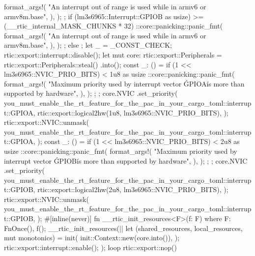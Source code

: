 {{{{{{{                                format_args!(
                                    "An interrupt out of range is used while in armv6 or armv8m.base",
                                ),
                            );
                        };
                    }
                    if (lm3s6965::Interrupt::GPIOB as usize)
                        >= (__rtic_internal_MASK_CHUNKS * 32)
                    {
                        {
                            ::core::panicking::panic_fmt(
                                format_args!(
                                    "An interrupt out of range is used while in armv6 or armv8m.base",
                                ),
                            );
                        };
                    }
                } else {}
            };
            let _ = _CONST_CHECK;
            rtic::export::interrupt::disable();
            let mut core: rtic::export::Peripherals = rtic::export::Peripherals::steal()
                .into();
            const _: () = if (1 << lm3s6965::NVIC_PRIO_BITS) < 1u8 as usize {
                {
                    ::core::panicking::panic_fmt(
                        format_args!(
                            "Maximum priority used by interrupt vector \'GPIOA\' is more than supported by hardware",
                        ),
                    );
                };
            };
            core.NVIC
                .set_priority(
                    you_must_enable_the_rt_feature_for_the_pac_in_your_cargo_toml::interrupt::GPIOA,
                    rtic::export::logical2hw(1u8, lm3s6965::NVIC_PRIO_BITS),
                );
            rtic::export::NVIC::unmask(
                you_must_enable_the_rt_feature_for_the_pac_in_your_cargo_toml::interrupt::GPIOA,
            );
            const _: () = if (1 << lm3s6965::NVIC_PRIO_BITS) < 2u8 as usize {
                {
                    ::core::panicking::panic_fmt(
                        format_args!(
                            "Maximum priority used by interrupt vector \'GPIOB\' is more than supported by hardware",
                        ),
                    );
                };
            };
            core.NVIC
                .set_priority(
                    you_must_enable_the_rt_feature_for_the_pac_in_your_cargo_toml::interrupt::GPIOB,
                    rtic::export::logical2hw(2u8, lm3s6965::NVIC_PRIO_BITS),
                );
            rtic::export::NVIC::unmask(
                you_must_enable_the_rt_feature_for_the_pac_in_your_cargo_toml::interrupt::GPIOB,
            );
            #[inline(never)]
            fn __rtic_init_resources<F>(f: F)
            where
                F: FnOnce(),
            {
                f();
            }
            __rtic_init_resources(|| {
                let (shared_resources, local_resources, mut monotonics) = init(
                    init::Context::new(core.into()),
                );
                rtic::export::interrupt::enable();
            });
            loop {
                rtic::export::nop()
            }
        }
    }
}
